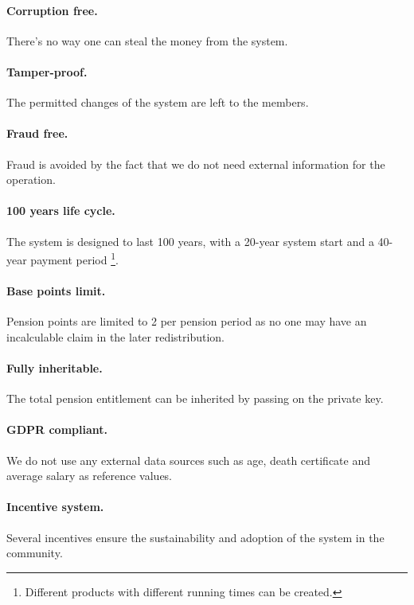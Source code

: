 \paragraph{Corruption free.} There's no way one can steal the money from the system. 

\paragraph{Tamper-proof.} The permitted changes of the system are left to the members.

\paragraph{Fraud free.}
Fraud is avoided by the fact that we do not need external information for the operation. 

\paragraph{100 years life cycle.} 
The system is designed to last 100 years, with a 20-year system start and a 40-year payment period \footnote{ Different products with different running times can be created.}.  

\paragraph{Base points limit.} 
Pension points are limited to 2 per pension period as no one may have an incalculable claim in the later redistribution.

\paragraph{Fully inheritable.}
The total pension entitlement can be inherited by passing on the private key.

\paragraph{GDPR compliant\cite{gdpr}.} 
We do not use any external data sources such as age, death certificate and average salary as reference values.

\paragraph{Incentive system.} 
Several incentives ensure the sustainability and adoption of the system in the community.

